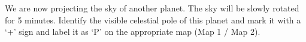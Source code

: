 We are now projecting the sky of another planet. The sky will be slowly
rotated for 5 minutes. Identify the visible celestial pole of this planet
and mark it with a `+' sign and label it as `P' on the appropriate map
(Map 1 / Map 2).

